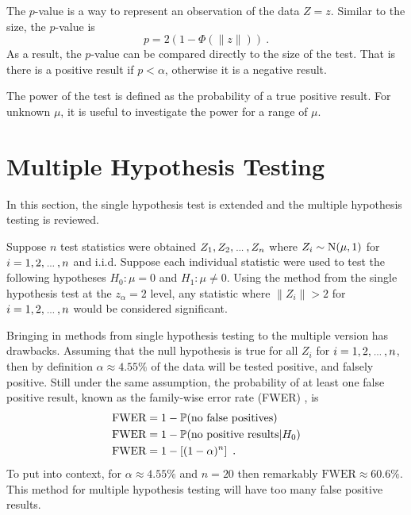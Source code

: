 The $p$-value is a way to represent an observation of the data $Z=z$. Similar to the size, the $p$-value is
\begin{equation}
    p=2(1-\Phi(\|z\|)) \ .
\end{equation}
As a result, the $p$-value can be compared directly to the size of the test. That is there is a positive result if $p<\alpha$, otherwise it is a negative result.

The power of the test is defined as the probability of a true positive result. For unknown $\mu$, it is useful to investigate the power for a range of $\mu$.

\section{Multiple Hypothesis Testing}

In this section, the single hypothesis test is extended and the multiple hypothesis testing \citep{shaffer1995multiple, dudoit2003multiple} is reviewed.

Suppose $n$ test statistics were obtained $Z_1,Z_2,\dotdotdot,Z_n$ where $Z_i\sim\operatorname{N}(\mu,1)$ for $i=1,2,\dotdotdot,n$ and i.i.d. Suppose each individual statistic were used to test the following hypotheses $H_0:\mu=0$ and $H_1:\mu\neq 0$. Using the method from the single hypothesis test at the $z_\alpha=2$ level, any statistic where $\|Z_i\|>2$ for $i=1,2,\dotdotdot,n$ would be considered significant.

Bringing in methods from single hypothesis testing to the multiple version has drawbacks. Assuming that the null hypothesis is true for all $Z_i$ for $i=1,2,\dotdotdot,n$, then by definition $\alpha\approx 4.55\%$ of the data will be tested positive, and falsely positive. Still under the same assumption, the probability of at least one false positive result, known as the family-wise error rate (FWER) \citep{shaffer1995multiple}, is
\begin{align}
    \text{FWER}&=1-\operatorname{\mathbb{P}}(\text{no false positives}) \nonumber\\
    \text{FWER}&=1-\operatorname{\mathbb{P}}(\text{no positive results}|H_0) \nonumber\\
    \text{FWER}&=1-\left[(1-\alpha)^n\right] \label{eq:inference_fwer}\ .
\end{align}
To put into context, for $\alpha\approx 4.55\%$ and $n=20$ then remarkably $\text{FWER}\approx60.6\%$. This method for multiple hypothesis testing will have too many false positive results.

